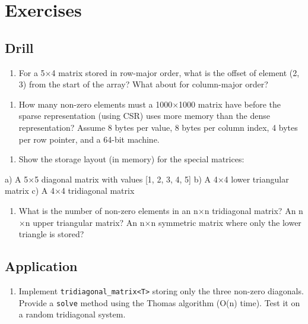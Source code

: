 \section{Exercises}

\subsection{Drill}

\begin{enumerate}
\item For a 5$\times $4 matrix stored in row-major order, what is the offset of element (2, 3) from the start of the array? What about for column-major order?
\end{enumerate}

\begin{enumerate}
\item How many non-zero elements must a 1000$\times $1000 matrix have before the sparse representation (using CSR) uses more memory than the dense representation? Assume 8 bytes per value, 8 bytes per column index, 4 bytes per row pointer, and a 64-bit machine.
\end{enumerate}

\begin{enumerate}
\item Show the storage layout (in memory) for the special matrices:
\end{enumerate}
   a) A 5$\times $5 diagonal matrix with values [1, 2, 3, 4, 5]
   b) A 4$\times $4 lower triangular matrix
   c) A 4$\times $4 tridiagonal matrix

\begin{enumerate}
\item What is the number of non-zero elements in an n$\times $n tridiagonal matrix? An n$\times $n upper triangular matrix? An n$\times $n symmetric matrix where only the lower triangle is stored?
\end{enumerate}

\subsection{Application}

\begin{enumerate}
\item Implement \texttt{tridiagonal\_matrix<T>} storing only the three non-zero diagonals. Provide a \texttt{solve} method using the Thomas algorithm (O(n) time). Test it on a random tridiagonal system.
\end{enumerate}

